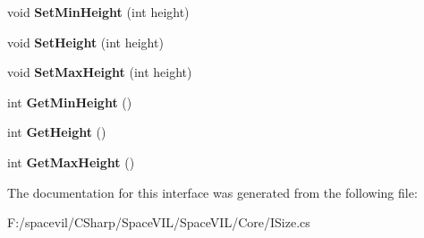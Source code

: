 \begin{DoxyCompactItemize}
void {\bfseries Set\+Min\+Height} (int height)
\item 
\mbox{\label{interface_space_v_i_l_1_1_core_1_1_i_size_ab0910bdbc76016cb6b4cc916fa149531}} 
void {\bfseries Set\+Height} (int height)
\item 
\mbox{\label{interface_space_v_i_l_1_1_core_1_1_i_size_a3717d11086772867d022652a06443e72}} 
void {\bfseries Set\+Max\+Height} (int height)
\item 
\mbox{\label{interface_space_v_i_l_1_1_core_1_1_i_size_a581efdd6c7fa9ef6938a87d24a276fd5}} 
int {\bfseries Get\+Min\+Height} ()
\item 
\mbox{\label{interface_space_v_i_l_1_1_core_1_1_i_size_a3989030b1e4cb112f049e60059f2d82b}} 
int {\bfseries Get\+Height} ()
\item 
\mbox{\label{interface_space_v_i_l_1_1_core_1_1_i_size_a620775c8c2d4300af33bfac30ff6bc93}} 
int {\bfseries Get\+Max\+Height} ()
\end{DoxyCompactItemize}


The documentation for this interface was generated from the following file\+:\begin{DoxyCompactItemize}
\item 
F\+:/spacevil/\+C\+Sharp/\+Space\+V\+I\+L/\+Space\+V\+I\+L/\+Core/I\+Size.\+cs\end{DoxyCompactItemize}
